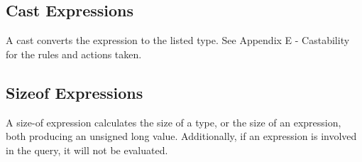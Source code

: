 \documentclass[letterpaper,12pt]{book}
\begin{document}
\subsection{Cast Expressions}

A cast converts the expression to the listed type. See Appendix E - Castability for the rules and actions taken.

\subsection{Sizeof Expressions}

A size-of expression calculates the size of a type, or the size of an expression, both producing an unsigned long value. Additionally, if an expression is involved in the query, it will not be evaluated.
\end{document}
